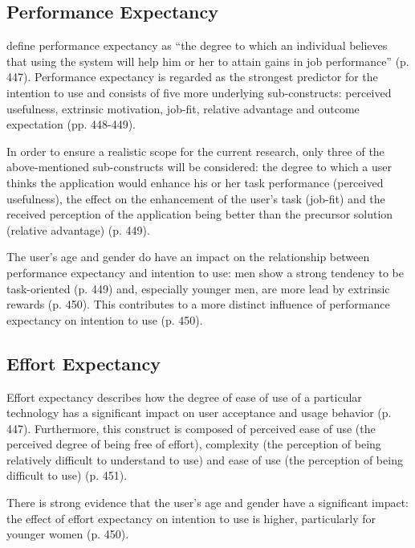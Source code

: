 \subsection{Performance Expectancy}
\textcite{Venkatesh2003UserAO} define performance expectancy as \enquote{the degree to which an individual believes that using the system will help him or her to attain gains in job performance} (p. 447). Performance expectancy is regarded as the strongest predictor for the intention to use and consists of five more underlying sub-constructs: perceived usefulness, extrinsic motivation, job-fit, relative advantage and outcome expectation (pp. 448-449).

In order to ensure a realistic scope for the current research, only three of the above-mentioned sub-constructs will be considered: the degree to which a user thinks the application would enhance his or her task performance (perceived usefulness), the effect on the enhancement of the user's task (job-fit) and the received perception of the application being better than the precursor solution (relative advantage) (p. 449).

The user's age and gender do have an impact on the relationship between performance expectancy and intention to use: men show a strong tendency to be task-oriented (p. 449) and, especially younger men, are more lead by extrinsic rewards (p. 450). This contributes to a more distinct influence of performance expectancy on intention to use (p. 450).

\subsection{Effort Expectancy}
Effort expectancy describes how the degree of ease of use of a particular technology \parencite[p. 450]{Venkatesh2003UserAO} has a significant impact on user acceptance and usage behavior (p. 447). Furthermore, this construct is composed of perceived ease of use (the perceived degree of being free of effort), complexity (the perception of being relatively difficult to understand to use) and ease of use (the perception of being difficult to use) (p. 451).

There is strong evidence that the user's age and gender have a significant impact: the effect of effort expectancy on intention to use is higher, particularly for younger women (p. 450).
